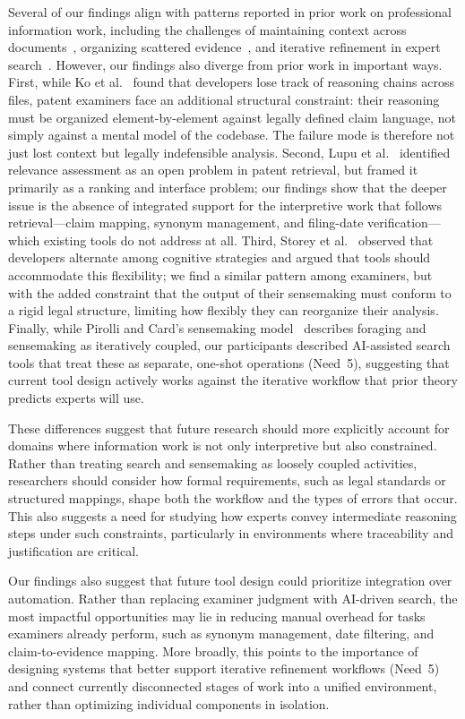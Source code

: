 \documentclass[sigconf]{acmart}
\begin{document}
Several of our findings align with patterns reported in prior work on professional information work, including the challenges of maintaining context across documents~\cite{Ko2006}, organizing scattered evidence~\cite{Russell1993}, and iterative refinement in expert search~\cite{Pirolli2005}. However, our findings also diverge from prior work in important ways. First, while Ko et al.~\cite{Ko2006} found that developers lose track of reasoning chains across files, patent examiners face an additional structural constraint: their reasoning must be organized element-by-element against legally defined claim language, not simply against a mental model of the codebase. The failure mode is therefore not just lost context but legally indefensible analysis. Second, Lupu et al.~\cite{Lupu2013} identified relevance assessment as an open problem in patent retrieval, but framed it primarily as a ranking and interface problem; our findings show that the deeper issue is the absence of integrated support for the interpretive work that follows retrieval---claim mapping, synonym management, and filing-date verification---which existing tools do not address at all. Third, Storey et al.~\cite{Storey1999} observed that developers alternate among cognitive strategies and argued that tools should accommodate this flexibility; we find a similar pattern among examiners, but with the added constraint that the output of their sensemaking must conform to a rigid legal structure, limiting how flexibly they can reorganize their analysis. Finally, while Pirolli and Card's sensemaking model~\cite{Pirolli2005} describes foraging and sensemaking as iteratively coupled, our participants described AI-assisted search tools that treat these as separate, one-shot operations (Need~5), suggesting that current tool design actively works against the iterative workflow that prior theory predicts experts will use.

These differences suggest that future research should more explicitly account for domains where information work is not only interpretive but also constrained. Rather than treating search and sensemaking as loosely coupled activities, researchers should consider how formal requirements, such as legal standards or structured mappings, shape both the workflow and the types of errors that occur. This also suggests a need for studying how experts convey intermediate reasoning steps under such constraints, particularly in environments where traceability and justification are critical.

Our findings also suggest that future tool design could prioritize integration over automation. Rather than replacing examiner judgment with AI-driven search, the most impactful opportunities may lie in reducing manual overhead for tasks examiners already perform, such as synonym management, date filtering, and claim-to-evidence mapping. More broadly, this points to the importance of designing systems that better support iterative refinement workflows (Need~5) and connect currently disconnected stages of work into a unified environment, rather than optimizing individual components in isolation.
\end{document}
